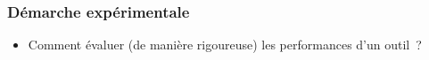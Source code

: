 \begin{frame}
\frametitle{Démarche expérimentale}




\begin{itemize}
    \item Comment évaluer (de manière rigoureuse) les performances d'un outil~?
\end{itemize}


\end{frame}
